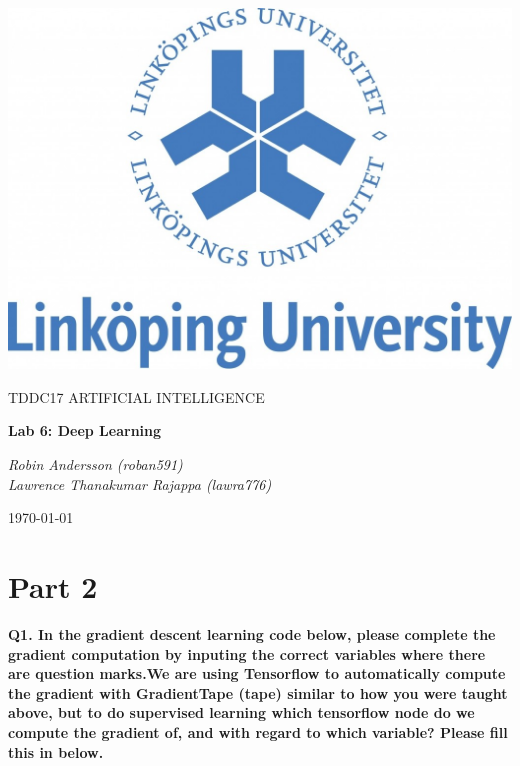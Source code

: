 \documentclass[a4paper,10pt]{article}
\begin{document}
\begin{titlepage}
	\centering
	\includegraphics[width=.6\textwidth]{liu-logo.png}\par
	\vfill
	{\scshape\Large TDDC17 ARTIFICIAL INTELLIGENCE\par}
	{\huge\bfseries Lab 6: Deep Learning\par}
	\vspace{1cm}
	{\large\itshape Robin Andersson (roban591) \\ Lawrence Thanakumar Rajappa (lawra776)\par}
	\vfill
	{\large \today\par}
\end{titlepage}



\section*{Part 2}
\textbf{Q1. In the gradient descent learning code below, please complete the gradient computation by inputing the
correct variables where there are question marks.We are using Tensorflow to automatically compute the gradient with
GradientTape (tape) similar to how you were taught above, but to do supervised learning which tensorflow node do
we compute the gradient of, and with regard to which variable? Please fill this in below.} \\
\end{document}
